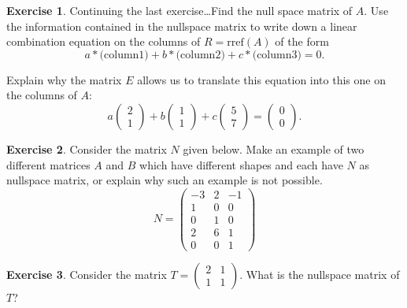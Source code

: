 \documentclass[11pt]{amsart}
\theoremstyle{definition}
\newtheorem{exercise}{Exercise}
\begin{document}
\begin{exercise}
Continuing the last exercise\dots Find the null space matrix of $A$. Use the information contained in the nullspace matrix to write down a linear combination equation on the columns of $R = \mathrm{rref}(A)$ of the form
\[
a * \text{(column1)} + b * \text{(column2)} + c * \text{(column3)} = 0.
\]

Explain why the matrix $E$ allows us to translate this equation into this one on the columns of $A$:
\[
a\begin{pmatrix} 2 \\ 1 \end{pmatrix} + b \begin{pmatrix} 1 \\ 1 \end{pmatrix} + c \begin{pmatrix} 5 \\ 7 \end{pmatrix} = \begin{pmatrix}0\\ 0 \end{pmatrix}.
\]
\end{exercise}

\begin{exercise}
Consider the matrix $N$ given below. Make an example of two different matrices $A$ and $B$ which have different shapes and each have $N$ as nullspace matrix, or explain why such an example is not possible.
\[
N = \begin{pmatrix}
-3 & 2 & -1 \\
 1 & 0 &  0 \\
 0 & 1 &  0 \\
 2 & 6 &  1 \\
 0 & 0 &  1
\end{pmatrix}
\]

\end{exercise}

\begin{exercise}
Consider the matrix $T = \left(\begin{smallmatrix} 2 & 1 \\ 1 & 1 \end{smallmatrix}\right)$. What is the nullspace matrix of $T$?
\end{exercise}
\end{document}
